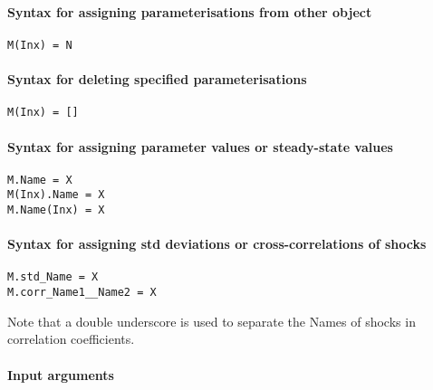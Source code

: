 


	\paragraph{Syntax for assigning parameterisations from other
object}

\begin{verbatim}
M(Inx) = N
\end{verbatim}

\paragraph{Syntax for deleting specified
parameterisations}

\begin{verbatim}
M(Inx) = []
\end{verbatim}

\paragraph{Syntax for assigning parameter values or steady-state
values}

\begin{verbatim}
M.Name = X
M(Inx).Name = X
M.Name(Inx) = X
\end{verbatim}

\paragraph{Syntax for assigning std deviations or cross-correlations of
shocks}

\begin{verbatim}
M.std_Name = X
M.corr_Name1__Name2 = X
\end{verbatim}

Note that a double underscore is used to separate the Names of shocks in
correlation coefficients.

\paragraph{Input arguments}

